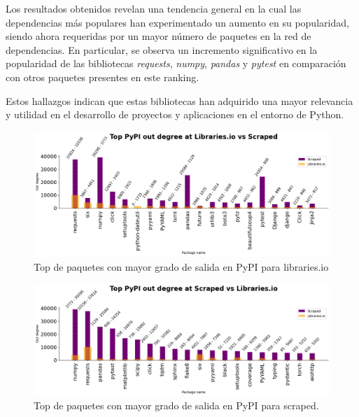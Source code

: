 Los resultados obtenidos revelan una tendencia general en la cual las dependencias más populares han
experimentado un aumento en su popularidad, siendo ahora requeridas por un mayor número de paquetes
en la red de dependencias. En particular, se observa un incremento significativo en la popularidad
de las bibliotecas \textit{requests}, \textit{numpy}, \textit{pandas} y \textit{pytest} en comparación
con otros paquetes presentes en este ranking.

Estos hallazgos indican que estas bibliotecas han adquirido una mayor relevancia y utilidad en el
desarrollo de proyectos y aplicaciones en el entorno de Python.

\begin{figure}[h!]
    \begin{center}
        \includegraphics[width=1\textwidth]{img/pypi/libio_t20_outd_comparison.png}
        \caption{Top de paquetes con mayor grado de salida en PyPI para libraries.io }
        \label{fig:pypi_libio_outd_comparison}
    \end{center}
\end{figure}

\begin{figure}[h!]
    \begin{center}
        \includegraphics[width=1\textwidth]{img/pypi/libio_scraped_t20_comparation.png}
        \caption{Top de paquetes con mayor grado de salida en PyPI para scraped.}
        \label{fig:pypi_scraped_outd_comparison}
    \end{center}
\end{figure}

